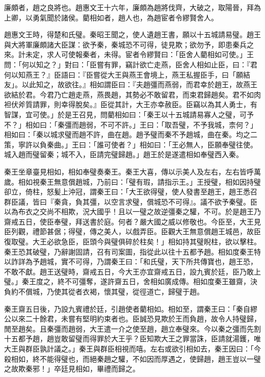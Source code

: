 
\begin{pinyinscope}
廉頗者，趙之良將也。趙惠文王十六年，廉頗為趙將伐齊，大破之，取陽晉，拜為上卿，以勇氣聞於諸侯。藺相如者，趙人也，為趙宦者令繆賢舍人。

趙惠文王時，得楚和氏璧。秦昭王聞之，使人遺趙王書，願以十五城請易璧。趙王與大將軍廉頗諸大臣謀：欲予秦，秦城恐不可得，徒見欺；欲勿予，即患秦兵之來。計未定，求人可使報秦者，未得。宦者令繆賢曰：「臣舍人藺相如可使。」王問：「何以知之？」對曰：「臣嘗有罪，竊計欲亡走燕，臣舍人相如止臣，曰：『君何以知燕王？』臣語曰：『臣嘗從大王與燕王會境上，燕王私握臣手，曰「願結友」。以此知之，故欲往。』相如謂臣曰：『夫趙彊而燕弱，而君幸於趙王，故燕王欲結於君。今君乃亡趙走燕，燕畏趙，其勢必不敢留君，而束君歸趙矣。君不如肉袒伏斧質請罪，則幸得脫矣。』臣從其計，大王亦幸赦臣。臣竊以為其人勇士，有智謀，宜可使。」於是王召見，問藺相如曰：「秦王以十五城請易寡人之璧，可予不？」相如曰：「秦彊而趙弱，不可不許。」王曰：「取吾璧，不予我城，柰何？」相如曰：「秦以城求璧而趙不許，曲在趙。趙予璧而秦不予趙城，曲在秦。均之二策，寧許以負秦曲。」王曰：「誰可使者？」相如曰：「王必無人，臣願奉璧往使。城入趙而璧留秦；城不入，臣請完璧歸趙。」趙王於是遂遣相如奉璧西入秦。

秦王坐章臺見相如，相如奉璧奏秦王。秦王大喜，傳以示美人及左右，左右皆呼萬歲。相如視秦王無意償趙城，乃前曰：「璧有瑕，請指示王。」王授璧，相如因持璧卻立，倚柱，怒髪上沖冠，謂秦王曰：「大王欲得璧，使人發書至趙王，趙王悉召群臣議，皆曰『秦貪，負其彊，以空言求璧，償城恐不可得』。議不欲予秦璧。臣以為布衣之交尚不相欺，況大國乎！且以一璧之故逆彊秦之驩，不可。於是趙王乃齋戒五日，使臣奉璧，拜送書於庭。何者？嚴大國之威以修敬也。今臣至，大王見臣列觀，禮節甚倨；得璧，傳之美人，以戲弄臣。臣觀大王無意償趙王城邑，故臣復取璧。大王必欲急臣，臣頭今與璧俱碎於柱矣！」相如持其璧睨柱，欲以擊柱。秦王恐其破璧，乃辭謝固請，召有司案圖，指從此以往十五都予趙。相如度秦王特以詐詳為予趙城，實不可得，乃謂秦王曰：「和氏璧，天下所共傳寶也，趙王恐，不敢不獻。趙王送璧時，齋戒五日，今大王亦宜齋戒五日，設九賓於廷，臣乃敢上璧。」秦王度之，終不可彊奪，遂許齋五日，舍相如廣成傳。相如度秦王雖齋，決負約不償城，乃使其從者衣褐，懷其璧，從徑道亡，歸璧于趙。

秦王齋五日後，乃設九賓禮於廷，引趙使者藺相如。相如至，謂秦王曰：「秦自繆公以來二十餘君，未嘗有堅明約束者也。臣誠恐見欺於王而負趙，故令人持璧歸，閒至趙矣。且秦彊而趙弱，大王遣一介之使至趙，趙立奉璧來。今以秦之彊而先割十五都予趙，趙豈敢留璧而得罪於大王乎？臣知欺大王之罪當誅，臣請就湯鑊，唯大王與群臣孰計議之。」秦王與群臣相視而嘻。左右或欲引相如去，秦王因曰：「今殺相如，終不能得璧也，而絕秦趙之驩，不如因而厚遇之，使歸趙，趙王豈以一璧之故欺秦邪！」卒廷見相如，畢禮而歸之。


\end{pinyinscope}
